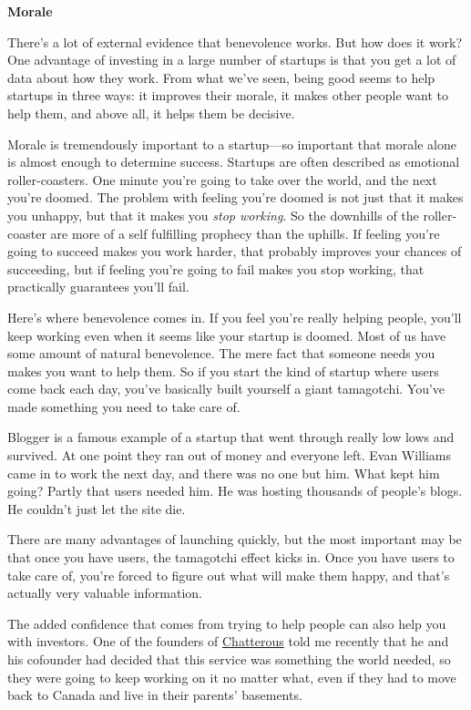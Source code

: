 \textbf{Morale}

There's a lot of external evidence that benevolence works. But how does
it work? One advantage of investing in a large number of startups is
that you get a lot of data about how they work. From what we've seen,
being good seems to help startups in three ways: it improves their
morale, it makes other people want to help them, and above all, it helps
them be decisive.

Morale is tremendously important to a startup---so important that morale
alone is almost enough to determine success. Startups are often
described as emotional roller-coasters. One minute you're going to take
over the world, and the next you're doomed. The problem with feeling
you're doomed is not just that it makes you unhappy, but that it makes
you \emph{stop working}. So the downhills of the roller-coaster are more
of a self fulfilling prophecy than the uphills. If feeling you're going
to succeed makes you work harder, that probably improves your chances of
succeeding, but if feeling you're going to fail makes you stop working,
that practically guarantees you'll fail.

Here's where benevolence comes in. If you feel you're really helping
people, you'll keep working even when it seems like your startup is
doomed. Most of us have some amount of natural benevolence. The mere
fact that someone needs you makes you want to help them. So if you start
the kind of startup where users come back each day, you've basically
built yourself a giant tamagotchi. You've made something you need to
take care of.

Blogger is a famous example of a startup that went through really low
lows and survived. At one point they ran out of money and everyone left.
Evan Williams came in to work the next day, and there was no one but
him. What kept him going? Partly that users needed him. He was hosting
thousands of people's blogs. He couldn't just let the site die.

There are many advantages of launching quickly, but the most important
may be that once you have users, the tamagotchi effect kicks in. Once
you have users to take care of, you're forced to figure out what will
make them happy, and that's actually very valuable information.

The added confidence that comes from trying to help people can also help
you with investors. One of the founders of
\href{http://chatterous.com}{Chatterous} told me recently that he and
his cofounder had decided that this service was something the world
needed, so they were going to keep working on it no matter what, even if
they had to move back to Canada and live in their parents' basements.

